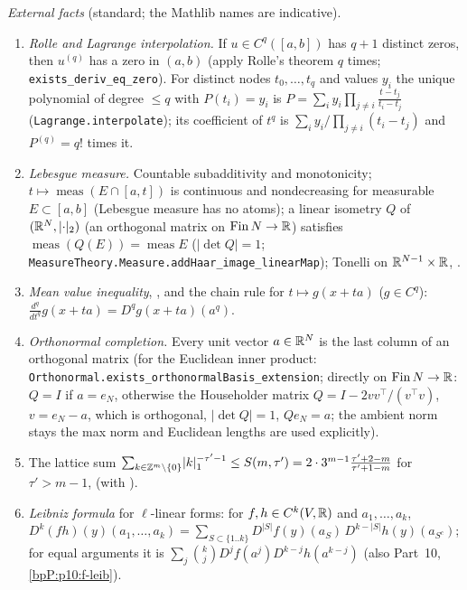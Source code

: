\emph{External facts} (standard; the Mathlib names are indicative).
\begin{enumerate}[label=(F\arabic*),ref=(F\arabic*)]
\item\label{bpP:p11a:f-rolle} \emph{Rolle and Lagrange interpolation.} If $u\in C^q([a,b])$ has $q+1$ distinct zeros, then $u^{(q)}$ has a zero in $(a,b)$ (apply Rolle's theorem $q$ times; \texttt{exists\_deriv\_eq\_zero}). For distinct nodes $t_0,\dots,t_q$ and values $y_i$ the unique polynomial of degree $\le q$ with $P(t_i)=y_i$ is $P=\sum_iy_i\prod_{j\ne i}\frac{t-t_j}{t_i-t_j}$ (\texttt{Lagrange.interpolate}); its coefficient of $t^q$ is $\sum_iy_i/\prod_{j\ne i}(t_i-t_j)$ and $P^{(q)}=q!$ times it.
\item\label{bpP:p11a:f-meas} \emph{Lebesgue measure.} Countable subadditivity and monotonicity; $t\mapsto\operatorname{meas}(E\cap[a,t])$ is continuous and nondecreasing for measurable $E\subset[a,b]$ (Lebesgue measure has no atoms); a linear isometry $Q$ of $(\mathbb{R}^N,\lvert\cdot\rvert_2)$ (an orthogonal matrix on $\mathrm{Fin}\,N\to\mathbb{R}$) satisfies $\operatorname{meas}(Q(E))=\operatorname{meas}E$ ($\lvert\det Q\rvert=1$; \texttt{MeasureTheory.Measure.addHaar\_image\_linearMap}); Tonelli on $\mathbb{R}^{N-1}\times\mathbb{R}$, .
\item\label{bpP:p11a:f-mvt} \emph{Mean value inequality}, , and the chain rule for $t\mapsto g(x+ta)$ ($g\in C^q$): $\frac{d^q}{dt^q}g(x+ta)=D^qg(x+ta)(a^q)$.
\item\label{bpP:p11a:f-orth} \emph{Orthonormal completion.} Every unit vector $a\in\mathbb{R}^N$ is the last column of an orthogonal matrix (for the Euclidean inner product: \texttt{Orthonormal.exists\_orthonormalBasis\_extension}; directly on $\mathrm{Fin}\,N\to\mathbb{R}$: $Q=I$ if $a=e_N$, otherwise the Householder matrix $Q=I-2vv^{\top}/(v^{\top}v)$, $v=e_N-a$, which is orthogonal, $\lvert\det Q\rvert=1$, $Qe_N=a$; the ambient norm stays the max norm and Euclidean lengths are used explicitly).
\item\label{bpP:p11a:f-lattice} The lattice sum $\sum_{k\in\mathbb{Z}^m\setminus\{0\}}\lvert k\rvert_1^{-\tau'-1}\le S(m,\tau')=2\cdot3^{m-1}\frac{\tau'+2-m}{\tau'+1-m}$ for $\tau'>m-1$,  (with ).
\item\label{bpP:p11a:f-leib} \emph{Leibniz formula} for $\ell$-linear forms: for $f,h\in C^k(V,\mathbb{R})$ and $a_1,\dots,a_k$, $D^k(fh)(y)(a_1,\dots,a_k)=\sum_{S\subset\{1..k\}}D^{\lvert S\rvert}f(y)(a_S)\,D^{k-\lvert S\rvert}h(y)(a_{S^c})$; for equal arguments it is $\sum_j\binom kjD^jf(a^j)D^{k-j}h(a^{k-j})$ (also Part~10, \ref{bpP:p10:f-leib}).
\end{enumerate}

